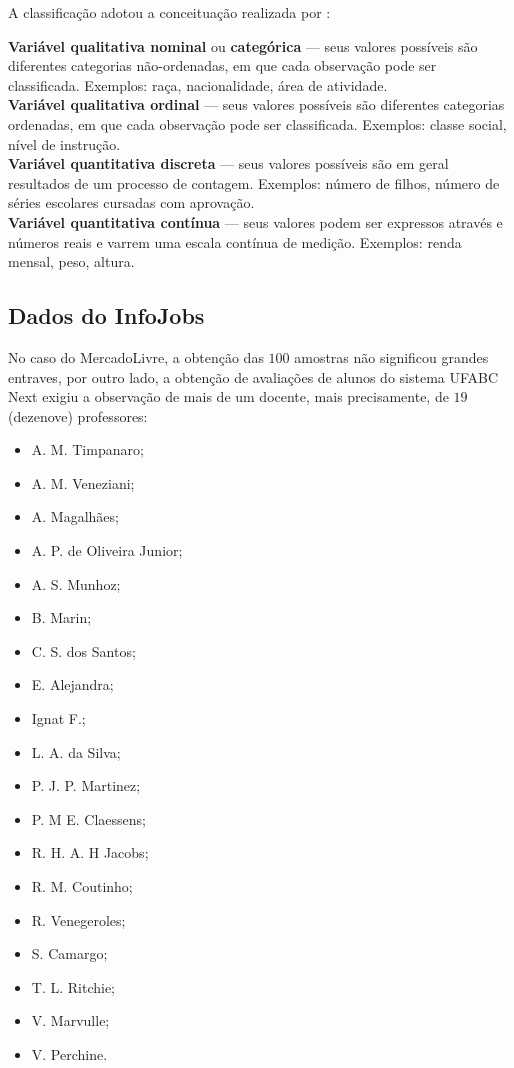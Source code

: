     A classificação adotou a conceituação realizada por :
    
    \begin{citacao}
        \textbf{Variável qualitativa nominal} ou \textbf{categórica} --- seus valores possíveis são diferentes categorias não-ordenadas, em que cada observação pode ser classificada. Exemplos: raça, nacionalidade, área de atividade. \\
        \textbf{Variável qualitativa ordinal} --- seus valores possíveis são diferentes categorias ordenadas, em que cada observação pode ser classificada. Exemplos: classe social, nível de instrução. \\
        \textbf{Variável quantitativa discreta} --- seus valores possíveis são em geral resultados de um processo de contagem. Exemplos: número de filhos, número de séries escolares cursadas com aprovação. \\
        \textbf{Variável quantitativa contínua} --- seus valores podem ser expressos através e números reais e varrem uma escala contínua de medição. Exemplos: renda mensal, peso, altura.
    \end{citacao}
    
    \subsection{Dados do InfoJobs}
    
    No caso do MercadoLivre, a obtenção das $100$ amostras não significou grandes entraves, por outro lado, a obtenção de avaliações de alunos do sistema UFABC Next exigiu a observação de mais de um docente, mais precisamente, de $19$ (dezenove) professores:
    
    \begin{itemize}
        \item A. M. Timpanaro;
        \item A. M. Veneziani;
        \item A. Magalhães;
        \item A. P. de Oliveira Junior;
        \item A. S. Munhoz;
        \item B. Marin;
        \item C. S. dos Santos;
        \item E. Alejandra;
        \item Ignat F.;
        \item L. A. da Silva;
        \item P. J. P. Martinez;
        \item P. M E. Claessens;
        \item R. H. A. H Jacobs;
        \item R. M. Coutinho;
        \item R. Venegeroles;
        \item S. Camargo;
        \item T. L. Ritchie;
        \item V. Marvulle;
        \item V. Perchine.
    \end{itemize}
	
